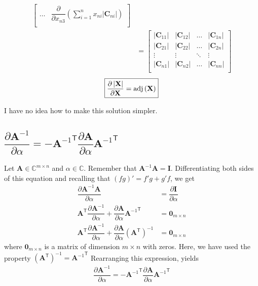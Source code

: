 \documentclass{article}
\newcommand{\trans}{\mathsf{T}}
\newcommand{\adj}[1]{\ensuremath{\textnormal{adj}\left(#1\right)}} %
\newcommand\abs[1]{\left\lvert#1\right\rvert}
\begin{document}
\begin{align}
\begin{bmatrix}
        \dots & 
        \displaystyle \dfrac{\partial}{\partial x_{n3}} \left( \sum_{i = 1}^{n} x_{ni} \abs{\mathbf{C}_{ni}} \right) \\
    \end{bmatrix} \\
    &= \begin{bmatrix}
        \abs{\mathbf{C}_{11}} & \abs{\mathbf{C}_{12}} & \dots & \abs{\mathbf{C}_{1n}} \\
        \abs{\mathbf{C}_{21}} & \abs{\mathbf{C}_{22}} & \dots & \abs{\mathbf{C}_{2n}} \\
        \vdots & \vdots & \ddots & \vdots \\
        \abs{\mathbf{C}_{n1}} & \abs{\mathbf{C}_{n2}} & \dots & \abs{\mathbf{C}_{nn}} \\
    \end{bmatrix}
\end{align}
\begin{align}
    \boxed{\dfrac{\partial \abs{\mathbf{X}}}{\partial \mathbf{X}} = \adj{\mathbf{X}}}
\end{align}

I have no idea how to make this solution simpler.

\subsection{\(\dfrac{\partial \mathbf{A}^{-1}}{\partial \alpha} = - {\mathbf{A}^{-1}}^{\trans} \dfrac{\partial \mathbf{A}}{\partial \alpha} {\mathbf{A}^{-1}}^{\trans}\)}
Let \(\mathbf{A}\in \mathbb{C}^{m\times n}\) and \(\alpha \in \mathbb{C}\). Remember that \(\mathbf{A}^{-1}\mathbf{A} = \mathbf{I}\). Differentiating both sides of this equation and recalling that \((fg)' = f'g + g'f\), we get
\begin{align}
    \dfrac{\partial \mathbf{A}^{-1}\mathbf{A}}{\partial \alpha} & = \dfrac{\partial \mathbf{I}}{\partial \alpha} \\
    \mathbf{A}^{\trans} \dfrac{\partial \mathbf{A}^{-1}}{\partial \alpha} + \dfrac{\partial \mathbf{A}}{\partial \alpha} {\mathbf{A}^{-1}}^{\trans} & = \mathbf{0}_{m \times n} \\
    \mathbf{A}^{\trans} \dfrac{\partial \mathbf{A}^{-1}}{\partial \alpha} + \dfrac{\partial \mathbf{A}}{\partial \alpha} \left( \mathbf{A}^{\trans} \right)^{-1} & = \mathbf{0}_{m \times n}
\end{align}
where \(\mathbf{0}_{m \times n}\) is a matrix of dimension \(m \times n\) with zeros. Here, we have used the property \(\left( \mathbf{A}^{\trans} \right)^{-1} = {\mathbf{A}^{-1}}^{\trans}\) Rearranging this expression, yields
\begin{align}
    \boxed{\dfrac{\partial \mathbf{A}^{-1}}{\partial \alpha} = - {\mathbf{A}^{-1}}^{\trans} \dfrac{\partial \mathbf{A}}{\partial \alpha} {\mathbf{A}^{-1}}^{\trans}}
\end{align}

\nocite{*}
\printbibliography
\end{document}
